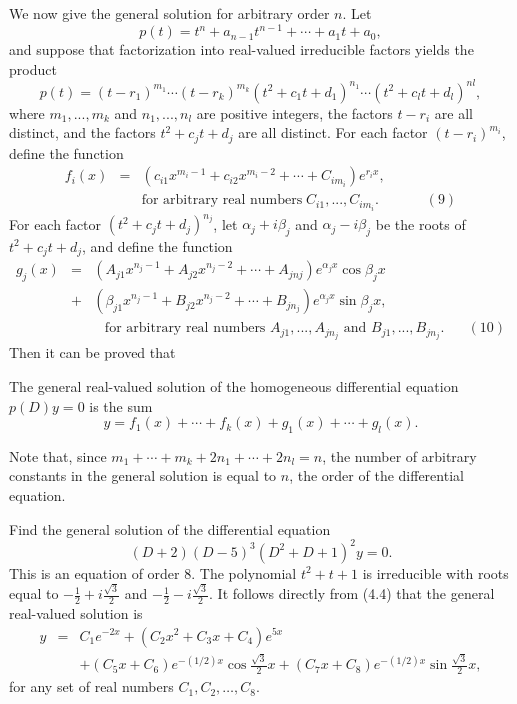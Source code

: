 We now give the general solution for arbitrary order $n$. Let 
$$
p(t) = t^n + a_{n - 1}t^{n-1} + \cdots + a_1t + a_0,
$$
and suppose that factorization into real-valued irreducible factors yields the product
$$
p(t) = (t - r_1)^{m_1} \cdots (t - r_k)^{m_k}(t^2 + c_1t + d_1)^{n_1} \cdots (t^2 + c_lt + d_l)^{nl},
$$
where $m_1, . . ., m_k$ and $n_1, . . ., n_l$ are positive integers, the factors $t - r_i$ are all distinct, and the factors $t^2 + c_jt + d_j$ are all distinct. For each factor $(t-r_i)^{m_i}$, define the function
\begin{eqnarray*}
f_i(x) &=& (c_{i1}x^{m_i -1} + c_{i2}x^{m_i - 2} + \cdots + C_{im_i} )e^{r_ix},  \\
&&\mbox{for arbitrary real numbers}\; C_{i1}, . . ., C_{im_i}. \;\;\;\;\;\;\;\;\;\;\;\; (9)
\end{eqnarray*}
For each factor $(t^2 + c_jt + d_j)^{n_j}$, let $\alpha_j + i\beta_j$ and $\alpha_j - i\beta_j$ be the roots of $t^2 + c_jt + d_j$, and define the function
\begin{eqnarray*}
g_j(x) &=& (A_{j1} x^{n_j-1} + A_{j2} x^{n_j - 2} + \cdots + A_{jnj})e^{\alpha_j x} \cos \beta_j x \\
&+&(\beta_{j1} x^{n_j-1} + B_{j2} x^{n_j-2} + \cdots + B_{jn_j})e^{\alpha_j x} \sin \beta_j x, \\
&&\;\;\;\mbox{for arbitrary real numbers $A_{j1}, . . ., A_{jn_j}$ and $B_{j1}, . . ., B_{jn_j}$} . \;\;\;\;\;\; (10)
\end{eqnarray*}
Then it can be proved that

\begin{theorem} The general real-valued solution of the homogeneous differential equation $p(D)y = 0$ is the sum
$$
y = f_1(x) + \cdots + f_k(x) + g_1(x) + \cdots + g_l(x) .
$$
\end{theorem}

Note that, since  $m_1 + \cdots + m_k + 2n_1 + \cdots + 2n_l = n$, the number of arbitrary constants in the general solution is equal to $n$, the order of the differential equation.
\begin{example} Find the general solution of the differential equation 
$$
(D + 2)(D - 5)^3(D^2 + D + 1)^2 y = 0. 
$$
This is an equation of order 8. The polynomial $t^2 + t + 1$ is irreducible with roots equal to $-\frac{1}{2} + i\frac{\sqrt 3}{2}$ and $-\frac{1}{2} - i \frac{\sqrt 3}{2}$. It follows directly from (4.4) that the general real-valued solution is
\begin{eqnarray*}
y &=& C_1e^{-2x} + (C_2x^2 + C_3x + C_4)e^{5x} \\
   &  & + (C_5x + C_6)e^{-(1/2)x} \cos \frac{\sqrt 3}{2}x + (C_7x + C_8)e^{-(1/2)x} \sin \frac{\sqrt 3}{2} x,
\end{eqnarray*}
for any set of real numbers $C_1, C_2, \ldots, C_8$.
\end{example}
